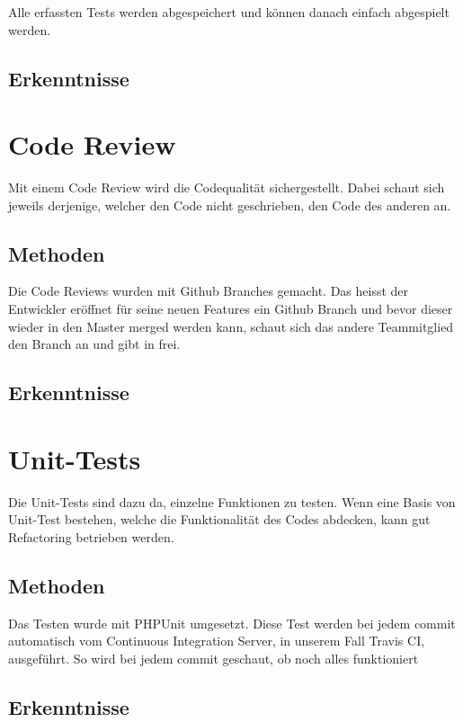 Alle erfassten Tests werden abgespeichert und können danach einfach abgespielt werden.

\subsection{Erkenntnisse}

\section{Code Review}
Mit einem Code Review wird die Codequalität sichergestellt. Dabei schaut sich jeweils derjenige, welcher den Code nicht geschrieben, den Code des anderen an. 


\subsection{Methoden}
Die Code Reviews wurden mit Github Branches gemacht. Das heisst der Entwickler eröffnet für seine neuen Features ein Github Branch und bevor dieser wieder in den Master merged werden kann, schaut sich das andere Teammitglied den Branch an und gibt in frei.

\subsection{Erkenntnisse}

\section{Unit-Tests}
Die Unit-Tests sind dazu da, einzelne Funktionen zu testen. Wenn eine Basis von Unit-Test bestehen, welche die Funktionalität des Codes abdecken, kann gut Refactoring betrieben werden. 

\subsection{Methoden}
Das Testen wurde mit PHPUnit umgesetzt. Diese Test werden bei jedem commit automatisch vom Continuous Integration Server, in unserem Fall Travis CI, ausgeführt. So wird bei jedem commit geschaut, ob noch alles funktioniert

\subsection{Erkenntnisse}


